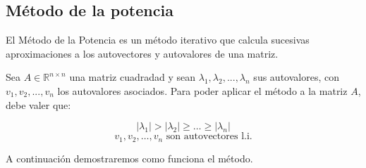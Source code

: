 \newpage
\subsection{Método de la potencia}\label{metodo_potencia}

El Método de la Potencia es un método iterativo que calcula sucesivas aproximaciones a los autovectores y autovalores de una matriz.

Sea $A\in\mathbb{R}^{n \times n}$ una matriz cuadradad y sean $\lambda_1,\lambda_2,...,\lambda_n$
sus autovalores, con $v_1,v_2,...,v_n$ los autovalores asociados. Para poder aplicar el método a
la matriz $A$, debe valer que:

$$|\lambda_1| > |\lambda_2| \geq \dots \geq |\lambda_n|$$
$$v_1, v_2, \dots, v_n \text{ son autovectores l.i.}$$

A continuación demostraremos como funciona el método.

